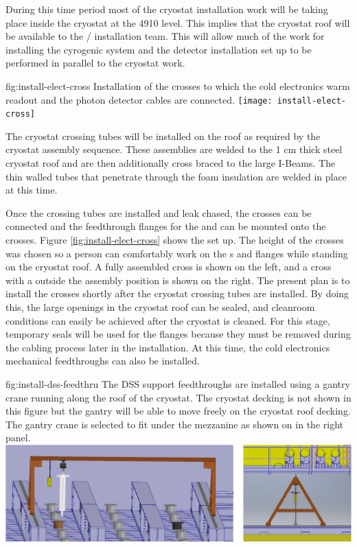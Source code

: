 During this time period most of the cryostat installation work will be taking place inside the cryostat at the 4910 level. 
This implies that the cryostat roof will be available to the / installation team.
This will allow much of the work for installing the cyrogenic system and the detector installation set up to be performed in parallel to the cryostat work. 

\begin{dunefigure}{fig:install-elect-cross}
  {Installation of the crosses to which the cold electronics warm readout and the photon detector cables are connected.}
 \texttt{[image: install-elect-cross]}
\end{dunefigure}

The cryostat crossing tubes will be installed on the roof as required by the cryostat assembly sequence. 
These assemblies are welded to the 1 \si{cm} thick steel cryostat roof and are then additionally cross braced to the large I-Beams. 
The thin walled tubes that penetrate through the foam insulation are welded in place at this time. 


Once the crossing tubes are installed and leak chased, the  crosses can be connected and the feedthrough flanges for the  and  can be mounted onto the crosses. Figure \ref{fig:install-elect-cross} shows the set up. 
The height of the crosses was chosen so a person can comfortably work on the s  and  flanges while standing on the cryostat roof. 
A fully assembled cross is shown on the left, and a cross with a  outside the assembly position is shown on the right. 
The present plan is to install the crosses shortly after the cryostat crossing tubes are installed. 
By doing this, the large openings in the cryostat roof can be sealed, and cleanroom conditions can easily be achieved after the cryostat is cleaned. 
For this stage, temporary seals will be used for the flanges because they must be removed during the cabling process later in the installation. At this time, the cold electronics mechanical feedthroughs can also be installed. 

\begin{dunefigure}{fig:install-dss-feedthru}
  {The DSS support feedthroughs are installed using a gantry crane running along the roof of the cryostat. The cryostat decking is not shown in this figure but the gantry will be able to move freely on the cryostat roof decking. The gantry crane is selected to fit under the mezzanine as shown on in the right panel.}
  \includegraphics[width=.98\textwidth]{graphics/install-dss-feedthru-v2.pdf}
\end{dunefigure}

